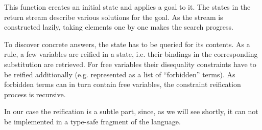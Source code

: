 This function creates an initial state and applies a goal to it. The states in the return stream describe
various solutions for the goal. As the stream is constructed lazily, taking elements one by one makes
the search progress.

To discover concrete answers, the state has to be queried for its contents. As a rule, a few variables
are reified in a state, i.e. their bindings in the corresponding substitution are retrieved. For free
variables their disequality constraints have to be reified additionally (e.g. represented as a list of
``forbidden'' terms). As forbidden terms can in turn contain free variables, the constraint reification
process is recursive.

In our case the reification is a subtle part, since, as we will see shortly, it can not be implemented in a 
type-safe fragment of the language.
